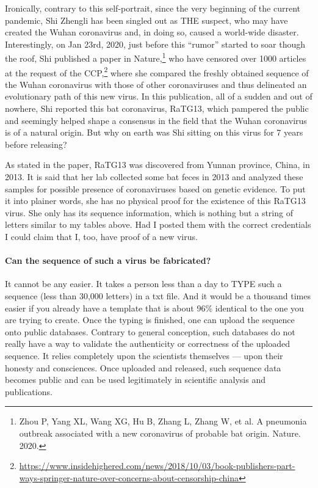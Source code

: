 \documentclass[11pt]{article}
\begin{document}
Ironically, contrary to this self-portrait, since the very beginning of the current pandemic, Shi Zhengli has been singled out as THE suspect, who may have created the Wuhan coronavirus and, in doing so, caused a world-wide disaster. Interestingly, on Jan 23rd, 2020, just before this “rumor” started to soar though the roof, Shi published a paper in Nature,\footnote{Zhou P, Yang XL, Wang XG, Hu B, Zhang L, Zhang W, et al. A pneumonia outbreak associated with a new coronavirus of probable bat origin. Nature. 2020.} who have censored over 1000 articles at the request of the CCP,\footnote{\url{https://www.insidehighered.com/news/2018/10/03/book-publishers-part-ways-springer-nature-over-concerns-about-censorship-china}} where she compared the freshly obtained sequence of the Wuhan coronavirus with those of other coronaviruses and thus delineated an evolutionary path of this new virus. In this publication, all of a sudden and out of nowhere, Shi reported this bat coronavirus, RaTG13, which pampered the public and seemingly helped shape a consensus in the field that the Wuhan coronavirus is of a natural origin. But why on earth was Shi sitting on this virus for 7 years before releasing?

As stated in the paper, RaTG13 was discovered from Yunnan province, China, in 2013. It is said that her lab collected some bat feces in 2013 and analyzed these samples for possible presence of coronaviruses based on genetic evidence. To put it into plainer words, she has no physical proof for the existence of this RaTG13 virus. She only has its sequence information, which is nothing but a string of letters similar to my tables above. Had I posted them with the correct credentials I could claim that I, too, have proof of a new virus.

\paragraph{Can the sequence of such a virus be fabricated?}
\label{sec:org6f5172b}
It cannot be any easier. It takes a person less than a day to TYPE such a sequence (less than 30,000 letters) in a txt file. And it would be a thousand times easier if you already have a template that is about 96\% identical to the one you are trying to create. Once the typing is finished, one can upload the sequence onto public databases. Contrary to general conception, such databases do not really have a way to validate the authenticity or correctness of the uploaded sequence. It relies completely upon the scientists themselves --- upon their honesty and consciences. Once uploaded and released, such sequence data becomes public and can be used legitimately in scientific analysis and publications.
\end{document}
